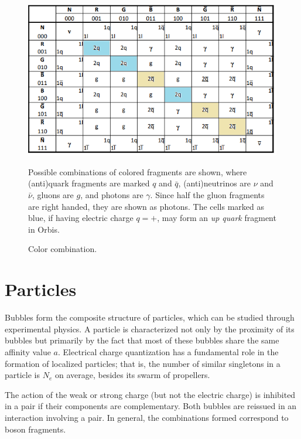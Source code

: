 \documentclass[12pt,english]{article}
\begin{document}
\begin{figure}
\caption{Color combination.\label{fig:color-combination}}
\medskip{}

\begin{centering}
\includegraphics[width=\linewidth]{fig4}
\par\end{centering}
\medskip{}

{\small{}Possible combinations of colored fragments are shown, where (anti)quark fragments are marked $q$ and $\bar{q}$, (anti)neutrinos are $\nu$ and $\bar{\nu}$, gluons are $g$, and photons are $\gamma$. Since half the gluon fragments are right handed, they are shown as photons. The cells marked as blue, if having electric charge $q=+$, may form an }\emph{\small{}up quark}{\small{} fragment in Orbis.}{\small\par}
\end{figure}


\section{Particles\label{sec:Particles}}

Bubbles form the composite structure of particles, which can be studied through experimental physics. A particle is characterized not only by the proximity of its bubbles but primarily by the fact that most of these bubbles share the same affinity value \( a \). Electrical charge quantization has a fundamental role in the formation of localized particles; that is, the number of similar singletons in a particle is $N_e$ on average, besides its swarm of propellers.

The action of the weak or strong charge (but not the electric charge) is inhibited in a pair if their components are complementary. Both bubbles are reissued in an interaction involving a pair. In general, the combinations formed correspond to boson fragments.
\end{document}

